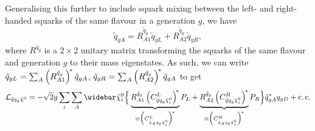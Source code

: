 \documentclass[../main.tex]{subfiles}
\begin{document}
Generalising this further to include squark mixing between the left- and
right-handed squarks of the same flavour in a generation \(g\), we have
\begin{equation}
  \tilde{q}_{gA} = R_{A1}^{\tilde{q}_g} \tilde{q}_{gL} + R_{A2}^{\tilde{q}_g} \tilde{q}_{gR},
\end{equation}
where \(R^{\tilde{q}_g}\) is a \(2\times 2\) unitary matrix transforming the squarks of the same flavour and generation \(g\) to their mass eigenstates.
As such, we can write \(\tilde{q}_{gL} = \sum_A \left(R^{\tilde{q}_g}_{A1}\right)^{\!\ast} \tilde{q}_{gA}\), \(\tilde{q}_{gR} = \sum_A \left(R^{\tilde{q}_g}_{A2}\right)^{\!\ast} \tilde{q}_{gA}\) to get
\begin{equation}
  \label{susy:eq:sqqneu-interaction-L}
  \L_{\tilde{q} q_g \tilde{\chi}^0} = -\sqrt{2} g \sum_{i} \sum_A \barnino[i] \Big\{ \underbrace{R^{\tilde{q}_g}_{A1} \pclosed{C_{\tilde{q} q_g \tilde{\chi}_i^0}^{L}}^{\!\ast}}_{\equiv \Big(C_{\tilde{q}_A q_g \tilde{\chi}_i^0}^{L}\Big)^{\!\ast}} P_L + \underbrace{R^{\tilde{q}_g}_{A2} \pclosed{C_{\tilde{q} q_g \tilde{\chi}_i^0}^{R}}^{\!\ast}}_{\equiv \Big(C_{\tilde{q}_A q_g \tilde{\chi}_i^0}^{R}\Big)^{\!\ast}} P_R \Big\} \tilde{q}_{gA}^\ast q_{gD} + \cc
\end{equation}
\end{document}
